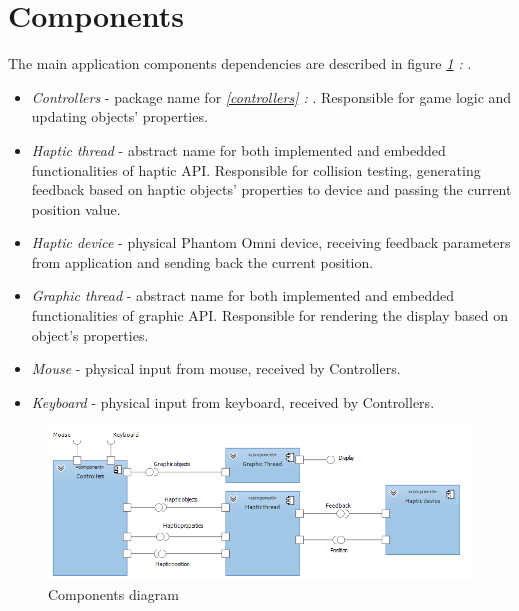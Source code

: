 \section{Components}
The main application components dependencies are described in figure \emph{\ref{fig:component} : }. 
\begin{itemize} [noitemsep]
\item \emph{Controllers} - package name for \emph{\ref{controllers} : }. Responsible for game logic and updating objects' properties.
\item \emph{Haptic thread} - abstract name for both implemented and embedded functionalities of haptic API. Responsible for collision testing, generating feedback based on haptic objects' properties to device and passing the current position value. 
\item \emph{Haptic device} - physical Phantom Omni device, receiving feedback parameters from application and sending back the current position.
\item \emph{Graphic thread} - abstract name for both implemented and embedded functionalities of graphic API. Responsible for rendering the display based on object's properties. 
\item \emph{Mouse} - physical input from mouse, received by Controllers.
\item \emph{Keyboard} - physical input from keyboard, received by Controllers.
\end{itemize}

\begin{figure}
\begin{center}
	\includegraphics[width=\textwidth]{Images/component_diagram}
	\caption{Components diagram}
	\label{fig:component}	
\end{center}
\end{figure}


